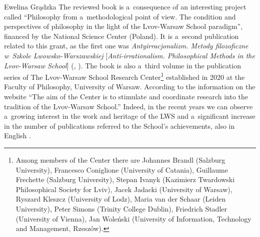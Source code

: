 \begin{newrevengenv}{Ewelina Grądzka}
The reviewed book is a~consequence of an interesting project called ``Philosophy from a~methodological point of view. The condition and perspectives of philosophy in the light of the Lvov-Warsaw School paradigm'', financed by the National Science Center (Poland). It is a~second publication related to this grant, as the first one was \textit{Antyirracjonalizm. Metody filozoficzne w~Szkole Lwowsko-Warszawskiej} [\textit{Anti-irrationalism. Philosophical Methods in the Lvov-Warsaw School}]
(\cite[][]{brozek_antyirracjonalizm_2020}, \cite*[Eng. transl.][]{brozek_anti-irrationalism_2020}). %
The book is also a~third volume in the publication series 
\parencites[][]{brozek_anti-irrationalism_2020}[][]{jadacki_stanislaw_2020} %
 of The Lvov-Warsaw School Research Center\footnote{Among members of the Center there are Johannes Brandl (Salzburg University), Francesco Coniglione (University of Catania), Guillaume Frechette (Salzburg University), Stepan Ivanyk (Kazimierz Twardowski Philosophical Society for Lviv), Jacek Jadacki (University of Warsaw), Ryszard Kleszcz (University of Lodz), Maria van der Schaar (Leiden University), Peter Simons (Trinity College Dublin), Friedrich Stadler (University of Vienna), Jan Woleński (University of Information, Technology and Management, Rzeszów).} established in 2020 at the Faculty of Philosophy, University of Warsaw. According to the information on the website ``The aim of the Center is to stimulate and coordinate research into the tradition of the Lvov-Warsaw School.'' 
\parencite[][]{noauthor_lws_nodate} %
 Indeed, in the recent years we can observe a~growing interest in the work and heritage of the LWS and a~significant increase in the number of publications referred to the School's achievements, also in English 
\parencites[][]{drabarek_interdisciplinary_2019}[][]{schaar_kazimierz_2016}[][]{wolenski_logic_1989}[][]{brandl_actions_1999}[][]{brozek_significance_2017}[][]{twardowski_prejudices_2014}[][]{simons_philosophy_1992}[][]{poli_polish_1993}[][]{kijania-placek_lvov-warsaw_1998}[][]{szaniawski_vienna_1989}[][]{chybinska_tradition_2016}. %

\end{newrevengenv}
